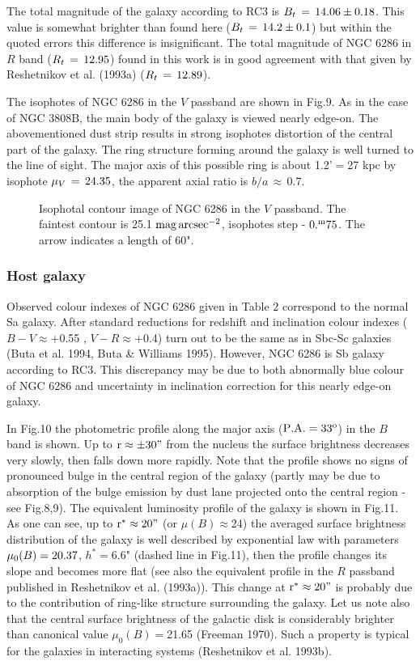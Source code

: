 The total magnitude of the galaxy according to RC3 is
$B_{t}\,=\rm\,14.06\pm0.18$. This value is somewhat brighter
than found here ($B_{t}\,=\rm\,14.2\pm0.1$) but within the
quoted errors this difference is insignificant. The total
magnitude of NGC 6286 in $R$ band ($R_{t}\,=\rm\,12.95$) found
in this work is in good agreement with that given by
Reshetnikov et al. (1993a) ($R_{t}\,=\rm\,12.89$).

The isophotes of NGC 6286 in the $V$ passband are shown in
Fig.9. As in the case of NGC 3808B, the main body of the
galaxy is viewed nearly edge-on. The abovementioned dust strip
results in strong isophotes distortion of the central part
of the galaxy. The ring structure forming around the galaxy
is well turned to the line of sight. The major axis of this
possible ring is about 1.2'$=$27 kpc by isophote $\mu_{V}\,=\rm\,
24.35$, the apparent axial ratio is $b/a\,\approx\,$0.7.

\begin{figure}
\picplace{1.5cm}
\caption[9]{
Isophotal contour image of NGC 6286 in the $V$ passband.
The faintest contour is 25.1 $\rm mag\,arcsec^{-2}$, isophotes step -
$\rm 0.^{m}75$. The arrow indicates
a length of 60".}
\end{figure}

\subsubsection{Host galaxy}

Observed colour indexes of NGC 6286 given in Table 2
correspond to the normal Sa galaxy. After standard reductions
for redshift and inclination colour indexes ($B-V\approx$+0.55 ,
$V-R\approx$+0.4) turn out to be the same
as in Sbc-Sc galaxies (Buta et al. 1994, Buta \& Williams 1995).
However, NGC 6286 is Sb galaxy according to RC3. This discrepancy
may be due to both abnormally blue colour of NGC 6286 and 
uncertainty in inclination correction for this nearly edge-on
galaxy.

In Fig.10 the photometric profile along the major axis
($\rm P.A.=33^{o}$) in the $B$ band is shown. Up to 
$\rm r\approx\pm30"$ from the nucleus the surface brightness
decreases very slowly, then falls down more rapidly. Note
that the profile shows no signs of pronounced bulge in the
central region of the galaxy (partly may be due to absorption
of the bulge emission by dust lane projected onto the central
region - see Fig.8,9). The equivalent luminosity profile of
the galaxy is shown in Fig.11. As one can see, up to
$\rm r^{*}\approx20"$ (or $\mu(B)\approx$24) the averaged 
surface brightness distribution of the galaxy is well described
by exponential law with parameters $\mu_{0}(B)\rm=20.37$,
$h^{*}=$6.6" (dashed line in Fig.11), 
then the profile changes its slope and becomes
more flat (see also the equivalent profile in the $R$ passband
published in Reshetnikov et al. (1993a)). This change at
$\rm r^{*}\approx20"$ is probably due to the contribution of
ring-like structure surrounding the galaxy. Let us note also
that the central surface brightness of the galactic disk is
considerably brighter than canonical value $\mu_{0}(B)=$21.65
(Freeman 1970). Such a property is typical for the galaxies
in interacting systems (Reshetnikov et al. 1993b).

